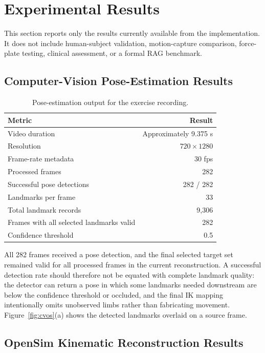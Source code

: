 \documentclass[11pt,a4paper]{article}
\begin{document}
\section{Experimental Results}

This section reports only the results currently available from the implementation. It does not include human-subject validation, motion-capture comparison, force-plate testing, clinical assessment, or a formal RAG benchmark.

\subsection{Computer-Vision Pose-Estimation Results}

\begin{table}[H]
\centering
\caption{Pose-estimation output for the exercise recording.}
\label{tab:pose}
\begin{tabular}{lr}
\toprule
\textbf{Metric} & \textbf{Result}\\
\midrule
Video duration & Approximately 9.375 s\\
Resolution & $720\times1280$\\
Frame-rate metadata & 30 fps\\
Processed frames & 282\\
Successful pose detections & 282 / 282\\
Landmarks per frame & 33\\
Total landmark records & 9,306\\
Frames with all selected landmarks valid & 282\\
Confidence threshold & 0.5\\
\bottomrule
\end{tabular}
\end{table}

All 282 frames received a pose detection, and the final selected target set remained valid for all processed frames in the current reconstruction. A successful detection rate should therefore not be equated with complete landmark quality: the detector can return a pose in which some landmarks needed downstream are below the confidence threshold or occluded, and the final IK mapping intentionally omits unobserved limbs rather than fabricating movement. Figure~\ref{fig:cvos}(a) shows the detected landmarks overlaid on a source frame.

\subsection{OpenSim Kinematic Reconstruction Results}
\end{document}
